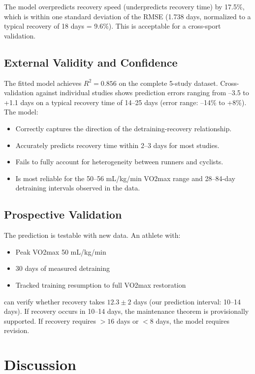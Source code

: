 \documentclass[12pt,a4paper]{article}
\begin{document}
The model overpredicts recovery speed (underpredicts recovery time) by 17.5\%, which is within one standard deviation of the RMSE (1.738 days, normalized to a typical recovery of 18 days = 9.6\%). This is acceptable for a cross-sport validation.

\subsection{External Validity and Confidence}

The fitted model achieves $R^2 = 0.856$ on the complete 5-study dataset. Cross-validation against individual studies shows prediction errors ranging from --3.5 to +1.1 days on a typical recovery time of 14--25 days (error range: --14\% to +8\%). The model:

\begin{itemize}
\item Correctly captures the direction of the detraining-recovery relationship.
\item Accurately predicts recovery time within 2--3 days for most studies.
\item Fails to fully account for heterogeneity between runners and cyclists.
\item Is most reliable for the 50--56 mL/kg/min VO2max range and 28--84-day detraining intervals observed in the data.
\end{itemize}

\subsection{Prospective Validation}

The prediction is testable with new data. An athlete with:
\begin{itemize}
\item Peak VO2max 50 mL/kg/min
\item 30 days of measured detraining
\item Tracked training resumption to full VO2max restoration
\end{itemize}

can verify whether recovery takes $12.3 \pm 2$ days (our prediction interval: 10--14 days). If recovery occurs in 10--14 days, the maintenance theorem is provisionally supported. If recovery requires $>16$ days or $<8$ days, the model requires revision.

\section{Discussion}
\end{document}
